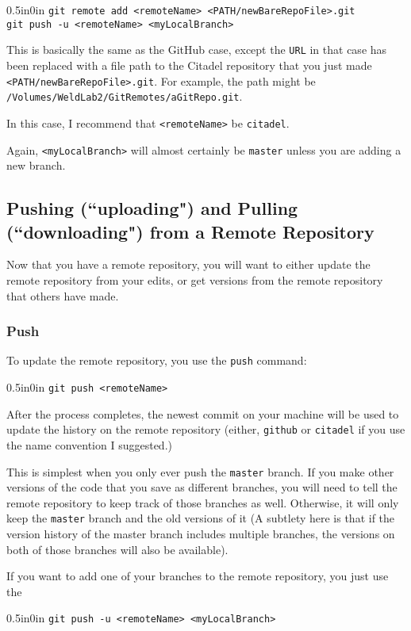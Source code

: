 \documentclass[11pt]{article}
\newcommand{\code}[1]{\begin{adjustwidth}{0.5in}{0in}
    \texttt{#1}
    \end{adjustwidth}}
\begin{document}
\code{git remote add <remoteName> <PATH/newBareRepoFile>.git\\
git push -u <remoteName> <myLocalBranch>}  

This is basically the same as the GitHub case, except the \texttt{URL} in that case has been replaced with a file path to the Citadel repository that you just made \texttt{<PATH/newBareRepoFile>.git}.  For example, the path might be \texttt{/Volumes/WeldLab2/GitRemotes/aGitRepo.git}.

In this case, I recommend that \texttt{<remoteName>} be \texttt{citadel}.

Again, \texttt{<myLocalBranch>} will almost certainly be \texttt{master} unless you are adding a new branch.

\subsection{Pushing (``uploading") and Pulling (``downloading") from a Remote Repository}
\label{sec:PushPull}

Now that you have a remote repository, you will want to either update the remote repository from your edits, or get versions from the remote repository that others have made.

\subsubsection{Push}
To update the remote repository, you use the \texttt{push} command:

\code{git push <remoteName>}

After the process completes, the newest commit on your machine will be used to update the history on the remote repository (either, \texttt{github} or \texttt{citadel} if you use the name convention I suggested.)

This is simplest when you only ever push the \texttt{master} branch.  If you make other versions of the code that you save as different branches, you will need to tell the remote repository to keep track of those branches as well.  Otherwise, it will only keep the \texttt{master} branch and the old versions of it (A subtlety here is that if the version history of the master branch includes multiple branches, the versions on both of those branches will also be available).

If you want to add one of your branches to the remote repository, you just use the 

\code{git push -u <remoteName> <myLocalBranch>}  
\end{document}
